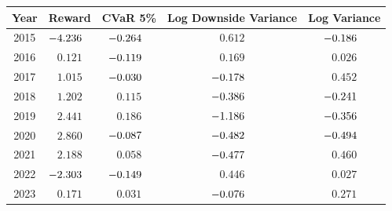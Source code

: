 \begingroup
\renewcommand{\arraystretch}{0.95}
\setlength{\tabcolsep}{6pt}
\begin{tabular}{@{}ccccc@{}}
\toprule
Year & Reward & CVaR 5\% & Log Downside Variance & Log Variance \\
\midrule
2015 & $\mathllap{-}4.236$\sym{***} & $\mathllap{-}0.264$\sym{***} & $0.612$\sym{***} & $\mathllap{-}0.186$ \\
2016 & $0.121$ & $\mathllap{-}0.119$ & $0.169$ & $0.026$ \\
2017 & $1.015$\sym{**} & $\mathllap{-}0.030$ & $\mathllap{-}0.178$ & $0.452$\sym{*} \\
2018 & $1.202$\sym{***} & $0.115$ & $\mathllap{-}0.386$\sym{*} & $\mathllap{-}0.241$\sym{**} \\
2019 & $2.441$\sym{***} & $0.186$\sym{**} & $\mathllap{-}1.186$\sym{***} & $\mathllap{-}0.356$ \\
2020 & $2.860$\sym{**} & $\mathllap{-}0.087$ & $\mathllap{-}0.482$ & $\mathllap{-}0.494$ \\
2021 & $2.188$\sym{***} & $0.058$ & $\mathllap{-}0.477$\sym{***} & $0.460$\sym{**} \\
2022 & $\mathllap{-}2.303$\sym{***} & $\mathllap{-}0.149$ & $0.446$ & $0.027$ \\
2023 & $0.171$ & $0.031$ & $\mathllap{-}0.076$ & $0.271$\sym{***} \\
\bottomrule
\end{tabular}
\endgroup

